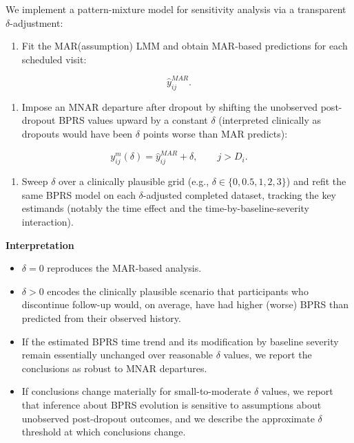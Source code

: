\documentclass[
  9pt,
  letterpaper,
  DIV=11,
  numbers=noendperiod]{scrartcl}
\providecommand{\tightlist}{%
  \setlength{\itemsep}{0pt}\setlength{\parskip}{0pt}}
\begin{document}
We implement a pattern-mixture model for sensitivity analysis via a
transparent \(\delta\)-adjustment:

\begin{enumerate}
\def\labelenumi{\arabic{enumi}.}
\tightlist
\item
  Fit the MAR(assumption) LMM and obtain MAR-based predictions for each
  scheduled visit:
\end{enumerate}

\[
\widehat{y}_{ij}^{MAR}.
\]

\begin{enumerate}
\def\labelenumi{\arabic{enumi}.}
\setcounter{enumi}{1}
\tightlist
\item
  Impose an MNAR departure after dropout by shifting the unobserved
  post-dropout BPRS values upward by a constant \(\delta\) (interpreted
  clinically as dropouts would have been \(\delta\) points worse than
  MAR predicts):
\end{enumerate}

\[
y_{ij}^{m}(\delta)=\widehat{y}_{ij}^{MAR}+\delta,\qquad j>D_i.
\]

\begin{enumerate}
\def\labelenumi{\arabic{enumi}.}
\setcounter{enumi}{2}
\tightlist
\item
  Sweep \(\delta\) over a clinically plausible grid (e.g.,
  \(\delta\in\{0,0.5,1,2,3\}\)) and refit the same BPRS model on each
  \(\delta\)-adjusted completed dataset, tracking the key estimands
  (notably the time effect and the time-by-baseline-severity
  interaction).
\end{enumerate}

\textbf{Interpretation}

\begin{itemize}
\tightlist
\item
  \(\delta=0\) reproduces the MAR-based analysis.
\item
  \(\delta>0\) encodes the clinically plausible scenario that
  participants who discontinue follow-up would, on average, have had
  higher (worse) BPRS than predicted from their observed history.
\item
  If the estimated BPRS time trend and its modification by baseline
  severity remain essentially unchanged over reasonable \(\delta\)
  values, we report the conclusions as robust to MNAR departures.
\item
  If conclusions change materially for small-to-moderate \(\delta\)
  values, we report that inference about BPRS evolution is sensitive to
  assumptions about unobserved post-dropout outcomes, and we describe
  the approximate \(\delta\) threshold at which conclusions change.
\end{itemize}
\end{document}
